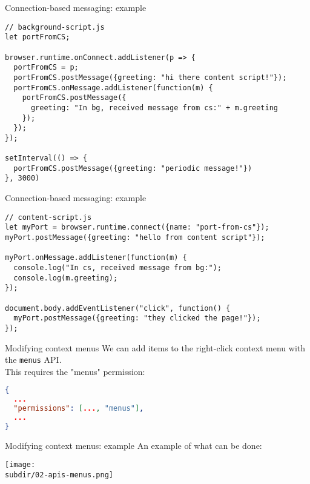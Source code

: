 \documentclass[../index.tex]{subfiles}
\begin{document}
\renewcommand{\currenttitle}{Connection-based messaging: example}
\begin{frame}[fragile]{\currenttitle}
  \begin{lstlisting}[language=ES6]
// background-script.js
let portFromCS;

browser.runtime.onConnect.addListener(p => {
  portFromCS = p;
  portFromCS.postMessage({greeting: "hi there content script!"});
  portFromCS.onMessage.addListener(function(m) {
    portFromCS.postMessage({
      greeting: "In bg, received message from cs:" + m.greeting
    });
  });
});

setInterval(() => {
  portFromCS.postMessage({greeting: "periodic message!"})
}, 3000)
  \end{lstlisting}
\end{frame}

\begin{frame}[fragile]{\currenttitle}
  \begin{lstlisting}[language=ES6]
// content-script.js
let myPort = browser.runtime.connect({name: "port-from-cs"});
myPort.postMessage({greeting: "hello from content script"});

myPort.onMessage.addListener(function(m) {
  console.log("In cs, received message from bg:");
  console.log(m.greeting);
});

document.body.addEventListener("click", function() {
  myPort.postMessage({greeting: "they clicked the page!"});
});
  \end{lstlisting}
\end{frame}

\renewcommand{\currenttitle}{Modifying context menus}
\begin{frame}[fragile]{\currenttitle}
  We can add items to the right-click context menu with the \texttt{menus}
  API\footnotemark{}.  \\[1em]

  This requires the "menus" permission:
  \begin{lstlisting}[language=json]
{
  ...
  "permissions": [..., "menus"],
  ...
}
  \end{lstlisting}

\end{frame}

\renewcommand{\currenttitle}{Modifying context menus: example}
\begin{frame}[fragile]{\currenttitle}
  An example of what can be done: \\[2em]

  \begin{center}
    \texttt{[image: \\subdir/02-apis-menus.png]}
  \end{center}
\end{frame}
\end{document}
